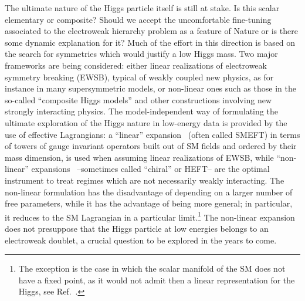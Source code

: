 \documentclass[11pt]{article}
\renewcommand{\[}{\begin{equation}}
\renewcommand{\]}{\end{equation}}
\begin{document}
The ultimate nature of the Higgs particle itself is still at stake. Is this scalar elementary or composite? Should we accept the uncomfortable fine-tuning associated 
to the electroweak hierarchy problem as a feature of Nature or is there some dynamic explanation for it? Much of the effort in this direction is based on the search 
for symmetries which would justify a low Higgs mass. Two major frameworks are being considered: either linear realizations of electroweak symmetry breaking (EWSB), 
typical of weakly coupled new physics, as for instance in many supersymmetric models, or non-linear ones such as those 
in the so-called ``composite Higgs models'' and other constructions involving new strongly 
interacting physics. The model-independent way of formulating the ultimate exploration of the Higgs nature in low-energy data is provided by the use of effective 
Lagrangians: a ``linear'' expansion~\cite{Buchmuller:1985jz,Grzadkowski:2010es} (often called SMEFT) in terms of towers of gauge invariant operators built 
out of SM fields and ordered by their mass dimension, is used when assuming linear realizations of EWSB, 
while ``non-linear'' expansions~\cite{Feruglio:1992wf,Alonso:2012jc,Azatov:2012bz,Alonso:2012px,Alonso:2012pz,Buchalla:2013rka,Brivio:2013pma} --sometimes called 
``chiral'' or HEFT-- are  the optimal instrument to treat regimes which are not necessarily weakly interacting. The non-linear formulation has the disadvantage of 
depending on a larger 
 number of free parameters, while it has the advantage of being more general; in particular, it reduces to the SM Lagrangian 
 in a particular limit.\footnote{The exception is the case in which the scalar manifold of the SM does not have a fixed point, as it would not admit then a linear 
 representation for the Higgs, see Ref.~\cite{Alonso:2016oah}.} The non-linear expansion does not presuppose that the Higgs particle at low energies belongs to an electroweak doublet, 
 a crucial question to be explored in the years to come.
\end{document}
